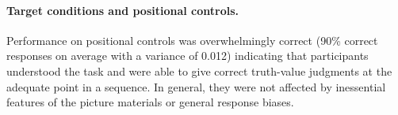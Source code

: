 \documentclass[fleqn,reqno,10pt]{article}
\newcommand{\as}{\acro{as}}
\renewcommand{\es}{\acro{es}}
\begin{document}
\paragraph{Target conditions and positional controls.}
Performance on positional controls was overwhelmingly correct (90\%
correct responses on average with a variance of 0.012) indicating that
participants understood the task and were able to give correct
truth-value judgments at the adequate point in a sequence. In
general, they were not affected by inessential features of the picture
materials or general response biases.




%
\end{document}
